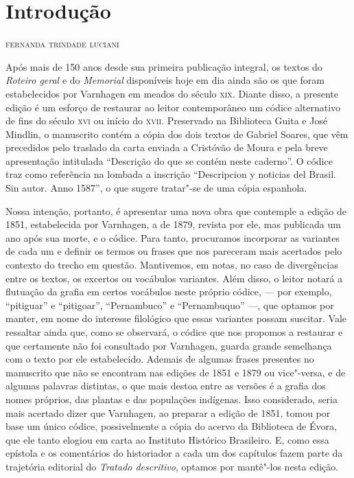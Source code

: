 \chapter[Introdução, \emph{por Fernanda Trindade Luciani}]{Introdução}

\begin{flushright}
\textsc{fernanda trindade luciani}\bigskip
\end{flushright}



\noindent{}Após mais de 150 anos desde sua primeira publicação
integral, os textos do \textit{Roteiro geral} e do \textit{Memorial}
disponíveis hoje em dia ainda são os que foram estabelecidos por
Varnhagen em meados do século \textsc{xix}. Diante disso, a presente edição é um
esforço de restaurar ao leitor contemporâneo um códice alternativo de
fins do século \textsc{xvi} ou início do \textsc{xvii}. Preservado na Biblioteca Guita e
José Mindlin, o manuscrito contém a cópia dos dois textos de Gabriel
Soares, que vêm precedidos pelo traslado da carta enviada a
Cristóvão de Moura e pela breve apresentação intitulada “Descrição do
que se contém neste caderno”.  O códice traz como referência na lombada
a inscrição “Descripcion y noticias del Brasil. Sin autor. Anno 1587”,
o que sugere tratar"-se de uma cópia espanhola.

Nossa intenção, portanto, é apresentar uma nova obra que contemple a edição
de 1851, estabelecida por Varnhagen, a de 1879, revista por ele, mas publicada um ano após sua
morte, e o códice. Para tanto, procuramos incorporar as
variantes de cada um e definir os termos ou frases que nos pareceram
mais acertados pelo contexto do trecho em questão. Mantivemos, em
notas, no caso de divergências entre os textos, os excertos ou
vocábulos variantes. Além disso, o leitor notará a flutuação da grafia 
em certos vocábulos neste próprio códice, --- por exemplo, ``pitiguar'' e ``pitigoar'', 
``Pernambuco'' e ``Pernambuquo'' ---, que optamos por manter, em nome do interesse 
filológico que essas variantes possam suscitar.
 Vale ressaltar ainda que, como se observará, o
códice que nos propomos a restaurar e que certamente não foi consultado
por Varnhagen, guarda grande semelhança com o texto por ele
estabelecido. Ademais de algumas frases presentes no manuscrito que não
se encontram nas edições de 1851 e 1879 ou vice"-versa, e de algumas
palavras distintas, o que mais destoa entre as versões é a grafia dos
nomes próprios, das plantas e das populações indígenas. Isso
considerado, seria mais acertado dizer que Varnhagen, ao preparar a
edição de 1851, tomou por base um único códice, possivelmente a cópia
do acervo da Biblioteca de Évora, que ele tanto elogiou em carta ao
Instituto Histórico Brasileiro. E, como essa epístola e os comentários
do historiador a cada um dos capítulos fazem parte da trajetória
editorial do \textit{Tratado descritivo}, optamos por mantê"-los nesta edição. 


